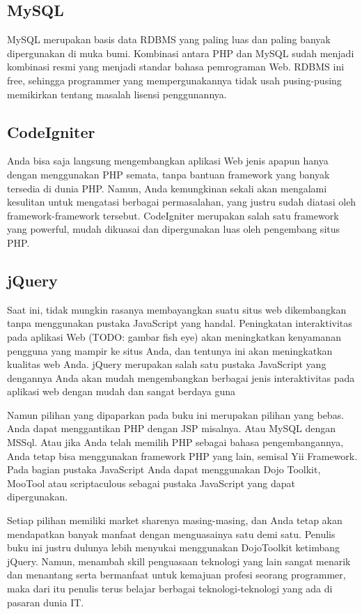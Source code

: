 \subsection{MySQL}
MySQL merupakan basis data RDBMS yang paling luas dan paling banyak dipergunakan di muka bumi. Kombinasi antara PHP dan MySQL sudah menjadi kombinasi resmi yang menjadi standar bahasa pemrograman Web. RDBMS ini free, sehingga programmer yang mempergunakannya tidak usah pusing-pusing memikirkan tentang masalah lisensi penggunannya.
\subsection{CodeIgniter}
Anda bisa saja langsung mengembangkan aplikasi Web jenis apapun hanya dengan menggunakan PHP semata, tanpa bantuan framework yang banyak tersedia di dunia PHP. Namun, Anda kemungkinan sekali akan mengalami kesulitan untuk mengatasi berbagai permasalahan, yang justru sudah diatasi oleh framework-framework tersebut. CodeIgniter merupakan salah satu framework yang powerful, mudah dikuasai dan dipergunakan luas oleh pengembang situs PHP.
\subsection{jQuery}
Saat ini, tidak mungkin rasanya membayangkan suatu situs web dikembangkan tanpa menggunakan pustaka JavaScript yang handal. Peningkatan interaktivitas pada aplikasi Web (TODO: gambar fish eye) akan meningkatkan kenyamanan pengguna yang mampir ke situs Anda, dan tentunya ini akan meningkatkan kualitas web Anda. jQuery merupakan salah satu pustaka JavaScript yang dengannya Anda akan mudah mengembangkan berbagai jenis interaktivitas pada aplikasi web dengan mudah dan sangat berdaya guna

Namun pilihan yang dipaparkan pada buku ini merupakan pilihan yang bebas. Anda dapat menggantikan PHP dengan JSP misalnya. Atau MySQL dengan MSSql. Atau jika Anda telah memilih PHP sebagai bahasa pengembangannya, Anda tetap bisa menggunakan framework PHP yang lain, semisal Yii Framework. Pada bagian pustaka JavaScript Anda dapat menggunakan Dojo Toolkit, MooTool atau scriptaculous sebagai pustaka JavaScript yang dapat dipergunakan.

Setiap pilihan memiliki market sharenya masing-masing, dan Anda tetap akan mendapatkan banyak manfaat dengan menguasainya satu demi satu. Penulis buku ini justru dulunya lebih menyukai menggunakan DojoToolkit ketimbang jQuery. Namun, menambah skill penguasaan teknologi yang lain sangat menarik dan menantang serta bermanfaat untuk kemajuan profesi seorang programmer, maka dari itu penulis terus belajar berbagai teknologi-teknologi yang ada di pasaran dunia IT.